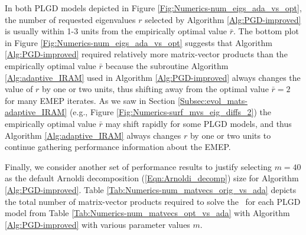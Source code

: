 In both PLGD models depicted in Figure \ref{Fig:Numerics-num_eigs_ada_vs_opt}, the number of requested eigenvalues $r$ selected by Algorithm \ref{Alg:PGD-improved} is usually within 1-3 units from the empirically optimal value $\bar{r}$.
The bottom plot in Figure \ref{Fig:Numerics-num_eigs_ada_vs_opt} suggests that Algorithm \ref{Alg:PGD-improved} required relatively more matrix-vector products than the empirically optimal value $\bar{r}$ because the subroutine Algorithm \ref{Alg:adaptive_IRAM} used in Algorithm \ref{Alg:PGD-improved} always changes the value of $r$ by one or two units, thus shifting away from the optimal value $\bar{r}=2$ for many EMEP iterates.
As we saw in Section \ref{Subsec:evol_mats-adaptive_IRAM} (e.g., Figure \ref{Fig:Numerics-surf_mvs_eig_diffs_2}) the empirically optimal value $\bar{r}$ may shift rapidly for some PLGD models, and thus Algorithm \ref{Alg:adaptive_IRAM} always changes $r$ by one or two units to continue gathering performance information about the EMEP.




Finally, we consider another set of performance results to justify selecting $m=40$ as the default Arnoldi decomposition (\ref{Eqn:Arnoldi_decomp}) size for Algorithm \ref{Alg:PGD-improved}.
Table \ref{Tab:Numerics-num_matvecs_orig_vs_ada} depicts the total number of matrix-vector products required to solve the \emep \ for each PLGD model from Table \ref{Tab:Numerics-num_matvecs_opt_vs_ada} with Algorithm \ref{Alg:PGD-improved} with various parameter values $m$.

